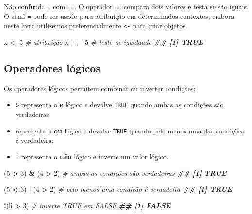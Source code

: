 \documentclass[
  portuguese,
  11pt,
  openany]{book}
\newenvironment{Shaded}{\begin{snugshade}}{\end{snugshade}}
\newcommand{\CommentTok}[1]{\textcolor[rgb]{0.56,0.35,0.01}{\textit{#1}}}
\newcommand{\DecValTok}[1]{\textcolor[rgb]{0.00,0.00,0.81}{#1}}
\newcommand{\DocumentationTok}[1]{\textcolor[rgb]{0.56,0.35,0.01}{\textbf{\textit{#1}}}}
\newcommand{\NormalTok}[1]{#1}
\newcommand{\OtherTok}[1]{\textcolor[rgb]{0.56,0.35,0.01}{#1}}
\newcommand{\SpecialCharTok}[1]{\textcolor[rgb]{0.81,0.36,0.00}{\textbf{#1}}}
\providecommand{\tightlist}{%
  \setlength{\itemsep}{0pt}\setlength{\parskip}{0pt}}
\begin{document}
Não confunda \texttt{=} com \texttt{==}. O operador \texttt{==} compara dois valores e testa se são iguais. O sinal \texttt{=} pode ser usado para atribuição em determinados contextos, embora neste livro utilizemos preferencialmente \texttt{\textless{}-} para criar objetos.

\begin{Shaded}
\begin{Highlighting}[]
\NormalTok{x }\OtherTok{\textless{}{-}} \DecValTok{5}      \CommentTok{\# atribuição}
\NormalTok{x }\SpecialCharTok{==} \DecValTok{5}      \CommentTok{\# teste de igualdade}
\DocumentationTok{\#\# [1] TRUE}
\end{Highlighting}
\end{Shaded}

\subsection{Operadores lógicos}\label{operadores-luxf3gicos}

Os operadores lógicos permitem combinar ou inverter condições:

\begin{itemize}
\tightlist
\item
  \texttt{\&} representa o \textbf{e} lógico e devolve \texttt{TRUE} quando ambas as condições são verdadeiras;
\item
  \texttt{\textbar{}} representa o \textbf{ou} lógico e devolve \texttt{TRUE} quando pelo menos uma das condições é verdadeira;
\item
  \texttt{!} representa o \textbf{não} lógico e inverte um valor lógico.
\end{itemize}

\begin{Shaded}
\begin{Highlighting}[]
\NormalTok{(}\DecValTok{5} \SpecialCharTok{\textgreater{}} \DecValTok{3}\NormalTok{) }\SpecialCharTok{\&}\NormalTok{ (}\DecValTok{4} \SpecialCharTok{\textgreater{}} \DecValTok{2}\NormalTok{)   }\CommentTok{\# ambas as condições são verdadeiras}
\DocumentationTok{\#\# [1] TRUE}

\NormalTok{(}\DecValTok{5} \SpecialCharTok{\textless{}} \DecValTok{3}\NormalTok{) }\SpecialCharTok{|}\NormalTok{ (}\DecValTok{4} \SpecialCharTok{\textgreater{}} \DecValTok{2}\NormalTok{)   }\CommentTok{\# pelo menos uma condição é verdadeira}
\DocumentationTok{\#\# [1] TRUE}

\SpecialCharTok{!}\NormalTok{(}\DecValTok{5} \SpecialCharTok{\textgreater{}} \DecValTok{3}\NormalTok{)            }\CommentTok{\# inverte TRUE em FALSE}
\DocumentationTok{\#\# [1] FALSE}
\end{Highlighting}
\end{Shaded}
\end{document}
